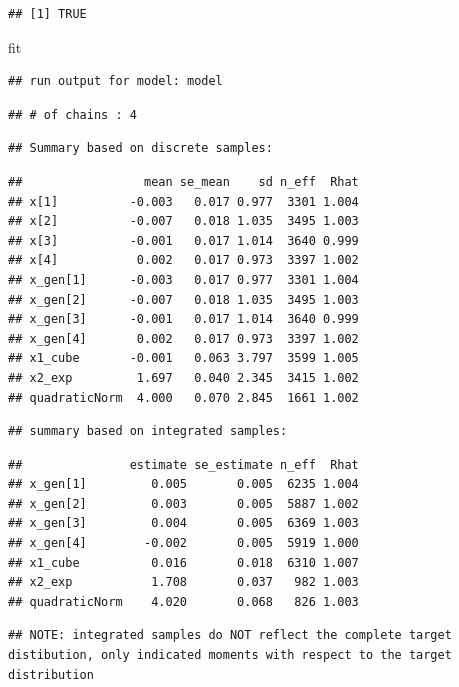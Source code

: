 \documentclass[
]{book}
\newenvironment{Shaded}{\begin{snugshade}}{\end{snugshade}}
\newcommand{\NormalTok}[1]{#1}
\begin{document}
\begin{verbatim}
## [1] TRUE
\end{verbatim}

\begin{Shaded}
\begin{Highlighting}[]
\NormalTok{fit}
\end{Highlighting}
\end{Shaded}

\begin{verbatim}
## run output for model: model
\end{verbatim}

\begin{verbatim}
## # of chains : 4
\end{verbatim}

\begin{verbatim}
## Summary based on discrete samples:
\end{verbatim}

\begin{verbatim}
##                 mean se_mean    sd n_eff  Rhat
## x[1]          -0.003   0.017 0.977  3301 1.004
## x[2]          -0.007   0.018 1.035  3495 1.003
## x[3]          -0.001   0.017 1.014  3640 0.999
## x[4]           0.002   0.017 0.973  3397 1.002
## x_gen[1]      -0.003   0.017 0.977  3301 1.004
## x_gen[2]      -0.007   0.018 1.035  3495 1.003
## x_gen[3]      -0.001   0.017 1.014  3640 0.999
## x_gen[4]       0.002   0.017 0.973  3397 1.002
## x1_cube       -0.001   0.063 3.797  3599 1.005
## x2_exp         1.697   0.040 2.345  3415 1.002
## quadraticNorm  4.000   0.070 2.845  1661 1.002
\end{verbatim}

\begin{verbatim}
## summary based on integrated samples:
\end{verbatim}

\begin{verbatim}
##               estimate se_estimate n_eff  Rhat
## x_gen[1]         0.005       0.005  6235 1.004
## x_gen[2]         0.003       0.005  5887 1.002
## x_gen[3]         0.004       0.005  6369 1.003
## x_gen[4]        -0.002       0.005  5919 1.000
## x1_cube          0.016       0.018  6310 1.007
## x2_exp           1.708       0.037   982 1.003
## quadraticNorm    4.020       0.068   826 1.003
\end{verbatim}

\begin{verbatim}
## NOTE: integrated samples do NOT reflect the complete target distibution, only indicated moments with respect to the target distribution
\end{verbatim}
\end{document}
